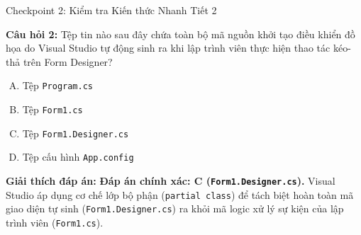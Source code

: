 \documentclass[aspectratio=169, 10pt]{beamer}
\begin{document}
\begin{frame}{Checkpoint 2: Kiểm tra Kiến thức Nhanh Tiết 2}
  \begin{alertblock}{\textbf{Câu hỏi 2:}}
    Tệp tin nào sau đây chứa toàn bộ mã nguồn khởi tạo điều khiển đồ họa do Visual Studio tự động sinh ra khi lập trình viên thực hiện thao tác kéo-thả trên Form Designer?
    \begin{enumerate}[(A)]
      \item Tệp \texttt{Program.cs}
      \item Tệp \texttt{Form1.cs}
      \item Tệp \texttt{Form1.Designer.cs}
      \item Tệp cấu hình \texttt{App.config}
    \end{enumerate}
  \end{alertblock}
  \pause
  \begin{exampleblock}{\textbf{Giải thích đáp án:}}
    \textbf{Đáp án chính xác: C (\texttt{Form1.Designer.cs}).} Visual Studio áp dụng cơ chế lớp bộ phận (\texttt{partial class}) để tách biệt hoàn toàn mã giao diện tự sinh (\texttt{Form1.Designer.cs}) ra khỏi mã logic xử lý sự kiện của lập trình viên (\texttt{Form1.cs}).
  \end{exampleblock}
\end{frame}
\end{document}
